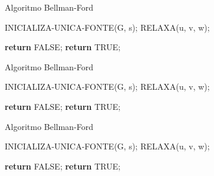 \documentclass{beamer}
\begin{document}
	\begin{frame}{Algoritmo Bellman-Ford}
		\begin{algorithm}[H]
			\caption{Bellman-Ford}\label{alg:d}
			\begin{algorithmic}[1]
				\State INICIALIZA-UNICA-FONTE(G, s);
				   
				\State RELAXA(u, v, w);   
				\EndFor
				\EndFor
				
				\State \textbf{return} FALSE;
				\EndIf
				\EndFor
				\State \textbf{return} TRUE;
				\EndProcedure
			\end{algorithmic}
		\end{algorithm}
	\end{frame}
	
	\begin{frame}{Algoritmo Bellman-Ford}
		\begin{algorithm}[H]
			\caption{Bellman-Ford}\label{alg:d}
			\begin{algorithmic}[1]
				\State INICIALIZA-UNICA-FONTE(G, s);
				   
				   
				\State RELAXA(u, v, w);   
				\EndFor
				\EndFor
				
				\State \textbf{return} FALSE;
				\EndIf
				\EndFor
				\State \textbf{return} TRUE;
				\EndProcedure
			\end{algorithmic}
		\end{algorithm}
	\end{frame}
	
	\begin{frame}{Algoritmo Bellman-Ford}
		\begin{algorithm}[H]
			\caption{Bellman-Ford}\label{alg:d}
			\begin{algorithmic}[1]
				\State INICIALIZA-UNICA-FONTE(G, s);
				   
				   
				\State RELAXA(u, v, w);   
				\EndFor
				\EndFor
				
				\State \textbf{return} FALSE;
				\EndIf
				\EndFor
				\State \textbf{return} TRUE;
				\EndProcedure
			\end{algorithmic}
		\end{algorithm}
	\end{frame}
	
\end{document}

